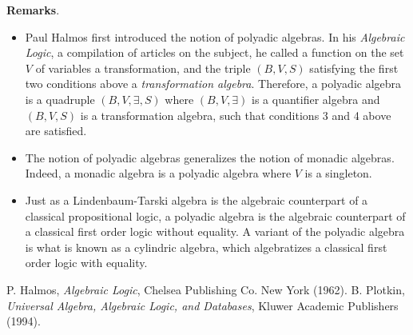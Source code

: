 \documentclass[12pt]{article}
\begin{document}
\textbf{Remarks}.  
\begin{itemize}
\item
Paul Halmos first introduced the notion of polyadic algebras.  In his \emph{Algebraic Logic}, a compilation of articles on the subject, he called a function on the set $V$ of variables a transformation, and the triple $(B,V,S)$ satisfying the first two conditions above a \emph{transformation algebra}.  Therefore, a polyadic algebra is a quadruple $(B,V,\exists,S)$ where $(B,V,\exists)$ is a quantifier algebra and $(B,V,S)$ is a transformation algebra, such that conditions 3 and 4 above are satisfied.
\item
The notion of polyadic algebras generalizes the notion of monadic algebras.  Indeed, a monadic algebra is a polyadic algebra where $V$ is a singleton.
\item
Just as a Lindenbaum-Tarski algebra is the algebraic counterpart of a classical propositional logic, a polyadic algebra is the algebraic counterpart of a classical first order logic without equality.  A variant of the polyadic algebra is what is known as a cylindric algebra, which algebratizes a classical first order logic with equality.
\end{itemize}

\begin{thebibliography}{8}
 P. Halmos, \emph{Algebraic Logic}, Chelsea Publishing Co. New York (1962).
 B. Plotkin, \emph{Universal Algebra, Algebraic Logic, and Databases}, Kluwer Academic Publishers (1994).
\end{thebibliography}
\end{document}
